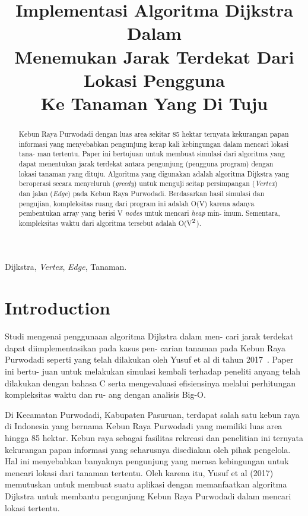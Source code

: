 \documentclass[conference]{IEEEtran}
\title{Implementasi Algoritma Dijkstra Dalam\\
Menemukan Jarak Terdekat Dari Lokasi Pengguna\\
Ke Tanaman Yang Di Tuju}
\author{\IEEEauthorblockN{Atadila Belva Ganya}
\IEEEauthorblockA{\textit{School of Electrical Engineering and Informatics}\\
\textit{Institut Teknologi Bandung}\\
Bandung, Indonesia\\
Email: 18320015@std.stei.itb.ac.id}
}
\begin{document}
\maketitle

\begin{abstract}
    Kebun Raya Purwodadi dengan luas area sekitar 85
    hektar ternyata kekurangan papan informasi yang menyebabkan
    pengunjung kerap kali kebingungan dalam mencari lokasi tana-
    man tertentu. Paper ini bertujuan untuk membuat simulasi
    dari algoritma yang dapat menentukan jarak terdekat antara
    pengunjung (pengguna program) dengan lokasi tanaman yang
    dituju. Algoritma yang digunakan adalah algoritma Dijkstra
    yang beroperasi secara menyeluruh (\emph{greedy}) untuk menguji
    seitap persimpangan (\emph{Vertex}) dan jalan (\emph{Edge}) pada Kebun
    Raya Purwodadi. Berdasarkan hasil simulasi dan pengujian,
    kompleksitas ruang dari program ini adalah O(V) karena adanya
    pembentukan array yang berisi V \emph{nodes} untuk mencari \emph{heap} min-
    imum. Sementara, kompleksitas waktu dari algoritma tersebut
    adalah O(V$\sp{2}$).
\end{abstract}

\begin{IEEEkeywords}
    Dijkstra, \emph{Vertex}, \emph{Edge}, Tanaman.
\end{IEEEkeywords}

\section{Introduction}
\setlength{\intextsep}{5pt} 
    Studi mengenai penggunaan algoritma Dijkstra dalam men-
    cari  jarak  terdekat  dapat  diimplementasikan  pada  kasus  pen-
    carian tanaman pada Kebun Raya Purwodadi seperti yang telah
    dilakukan oleh Yusuf et al di tahun 2017~\cite{j-ptiik}. Paper ini bertu-
    juan  untuk  melakukan  simulasi  kembali  terhadap  peneliti
    anyang  telah  dilakukan  dengan  bahasa  C  serta  mengevaluasi
    efisiensinya  melalui  perhitungan  kompleksitas  waktu  dan  ru-
    ang dengan analisis Big-O.\par

    Di  Kecamatan  Purwodadi,  Kabupaten  Pasuruan,  terdapat
    salah  satu  kebun  raya  di  Indonesia  yang  bernama  Kebun
    Raya  Purwodadi  yang  memiliki  luas  area  hingga  85  hektar.
    Kebun raya sebagai fasilitas rekreasi dan penelitian ini ternyata
    kekurangan papan informasi yang seharusnya disediakan oleh
    pihak pengelola. Hal ini menyebabkan banyaknya pengunjung
    yang merasa kebingungan untuk mencari lokasi dari tanaman
    tertentu.  Oleh  karena  itu,  Yusuf  et  al  (2017)  memutuskan
    untuk membuat suatu aplikasi dengan memanfaatkan algoritma
    Dijkstra untuk membantu pengunjung Kebun Raya Purwodadi
    dalam mencari lokasi tertentu.\par
\end{document}

